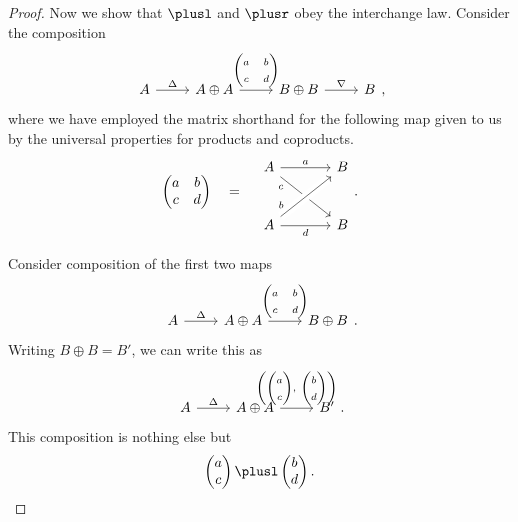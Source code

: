 \documentclass[main.tex]{subfiles}
\begin{document}
\begin{proof}
  Now we show that $\plusl$ and $\plusr$ obey the interchange law. Consider the composition
  \begin{equation*}
    \begin{tikzcd}[ampersand replacement=\&]
      A
      \arrow[r, "\Delta"]
      \& A \oplus A
      \arrow[r, "{\begin{pmatrix}a & b \\ c & d\end{pmatrix}}"]
      \& B \oplus B
      \arrow[r, "\nabla"]
      \& B
    \end{tikzcd},
  \end{equation*}
  where we have employed the matrix shorthand for the following map given to us by the universal properties for products and coproducts.
  \begin{equation*}
    \begin{pmatrix}
      a & b
      \\
      c & d
    \end{pmatrix}
    \quad = \quad
    \begin{tikzcd}[row sep=large, column sep=large]
      A
      \arrow[r, "a"]
      \arrow[dr, very near start, swap, "c"]
      & B
      \\
      A
      \arrow[ur, very near start, crossing over, "b"]
      \arrow[r, swap, "d"]
      & B
    \end{tikzcd}.
  \end{equation*}

  Consider composition of the first two maps
  \begin{equation*}
    \begin{tikzcd}[ampersand replacement=\&]
      A
      \arrow[r, "\Delta"]
      \& A \oplus A
      \arrow[r, "{\begin{pmatrix}a & b \\ c & d\end{pmatrix}}"]
      \& B \oplus B
    \end{tikzcd}.
  \end{equation*}
  Writing $B \oplus B = B'$, we can write this as
  \begin{equation*}
    \begin{tikzcd}[ampersand replacement=\&]
      A
      \arrow[r, "\Delta"]
      \& A \oplus A
      \arrow[r, "{\left( \begin{pmatrix}a \\ c\end{pmatrix},\ \begin{pmatrix}b \\ d\end{pmatrix} \right)}"]
      \& B'
    \end{tikzcd}.
  \end{equation*}
  This composition is nothing else but
  \begin{equation*}
     \begin{pmatrix}a \\ c\end{pmatrix} \plusl \begin{pmatrix}b \\ d\end{pmatrix}.
  \end{equation*}


\end{proof}
\end{document}
